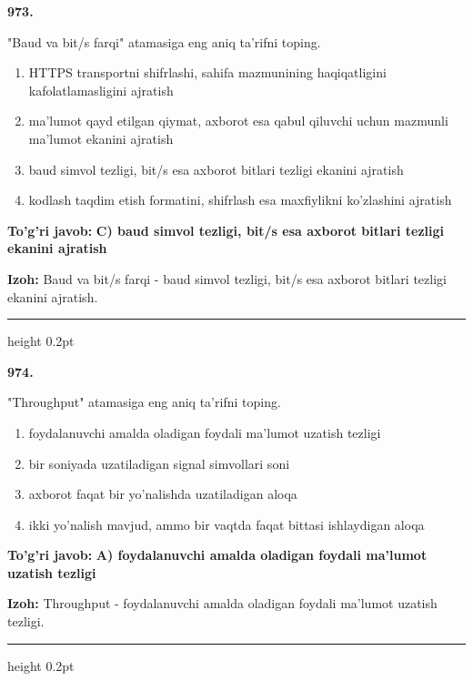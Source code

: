 \documentclass[10pt,a4paper,oneside]{article}
\begin{document}
\noindent\textbf{\color{ink}973.}
\par
"Baud va bit/s farqi" atamasiga eng aniq ta'rifni toping.
\begin{enumerate}[label=\Alph*),leftmargin=9mm]
\item HTTPS transportni shifrlashi, sahifa mazmunining haqiqatligini kafolatlamasligini ajratish
\item ma'lumot qayd etilgan qiymat, axborot esa qabul qiluvchi uchun mazmunli ma'lumot ekanini ajratish
\item baud simvol tezligi, bit/s esa axborot bitlari tezligi ekanini ajratish
\item kodlash taqdim etish formatini, shifrlash esa maxfiylikni ko'zlashini ajratish
\end{enumerate}
\begin{tcolorbox}[enhanced,breakable,colback=teal!4,colframe=teal!50!black,boxrule=0.5pt,arc=1.1mm,left=3mm,right=3mm,top=1.7mm,bottom=1.7mm,before skip=2mm,after skip=2mm]
\textbf{\color{teal}To'g'ri javob:} \textbf{C) baud simvol tezligi, bit/s esa axborot bitlari tezligi ekanini ajratish}
\par\smallskip
\textbf{Izoh:} Baud va bit/s farqi - baud simvol tezligi, bit/s esa axborot bitlari tezligi ekanini ajratish.
\end{tcolorbox}
\vspace{2mm}\hrule height 0.2pt \vspace{3mm}

\noindent\textbf{\color{ink}974.}
\par
"Throughput" atamasiga eng aniq ta'rifni toping.
\begin{enumerate}[label=\Alph*),leftmargin=9mm]
\item foydalanuvchi amalda oladigan foydali ma'lumot uzatish tezligi
\item bir soniyada uzatiladigan signal simvollari soni
\item axborot faqat bir yo'nalishda uzatiladigan aloqa
\item ikki yo'nalish mavjud, ammo bir vaqtda faqat bittasi ishlaydigan aloqa
\end{enumerate}
\begin{tcolorbox}[enhanced,breakable,colback=teal!4,colframe=teal!50!black,boxrule=0.5pt,arc=1.1mm,left=3mm,right=3mm,top=1.7mm,bottom=1.7mm,before skip=2mm,after skip=2mm]
\textbf{\color{teal}To'g'ri javob:} \textbf{A) foydalanuvchi amalda oladigan foydali ma'lumot uzatish tezligi}
\par\smallskip
\textbf{Izoh:} Throughput - foydalanuvchi amalda oladigan foydali ma'lumot uzatish tezligi.
\end{tcolorbox}
\vspace{2mm}\hrule height 0.2pt \vspace{3mm}
\end{document}
